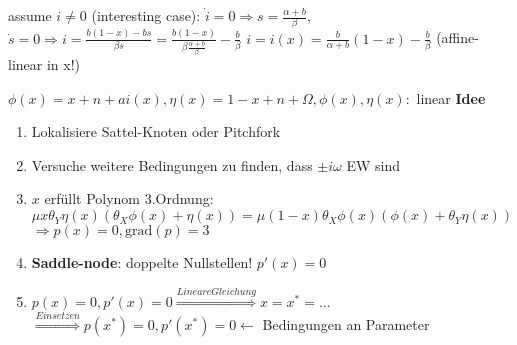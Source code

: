 \documentclass[10pt,a4paper]{article}
\begin{document}
assume $i \neq 0$ (interesting case):\newline
$\dot{i} = 0 \Rightarrow s = \frac{\alpha + b}{\beta}$,\newline
$\dot{s} = 0 \Rightarrow i = \frac{b(1-x)-bs}{\beta s} = \frac{b(1-x)}{\beta\frac{\alpha + b}{\beta}}-\frac{b}{\beta}$\newline\newline
$i = i(x) = \frac{b}{\alpha + b}(1-x) - \frac{b}{\beta}$ (affine-linear in x!)\newline\newline

$\phi(x) = x+n+ai(x), \eta(x) = 1-x+n+\Omega, \phi(x),\eta(x):$ linear\newline
\textbf{Idee}
\begin{enumerate}
	\item Lokalisiere Sattel-Knoten oder Pitchfork
	\item Versuche weitere Bedingungen zu finden, dass $\pm i\omega$ EW sind
	\item $x$ erfüllt Polynom 3.Ordnung: $\mu x \theta_Y \eta(x)\left(\theta_X\phi(x)+ \eta(x)\right) = \mu(1-x)\theta_X\phi(x)\left(\phi(x)+\theta_Y\eta(x)\right)$\\
	$\Rightarrow p(x) = 0, \mathrm{grad}(p) = 3$
	\item \textbf{Saddle-node}: doppelte Nullstellen! $p'(x) = 0$
	\item $p(x) = 0, p'(x) = 0 \overset{Lineare Gleichung}{\Rightarrow}x = x^* = \dots$\\
	$\overset{Einsetzen}{\Rightarrow}p(x^*) = 0, p'(x^*) = 0 \leftarrow$ Bedingungen an Parameter
\end{enumerate}
\end{document}
